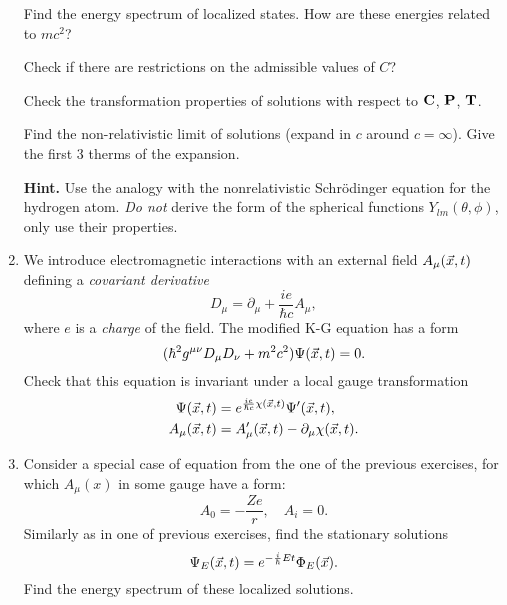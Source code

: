 \documentclass[a4paper,11pt]{article}
\begin{document}
\begin{enumerate}
  Find the energy spectrum of localized states. How are these energies
  related to $m c^{ 2 }$?

  Check if there are restrictions on the admissible values of $C$?

  Check the transformation properties of solutions with respect to
  $\mathbf{C}$, $\mathbf{P}$, $\mathbf{T}$.

  Find the non-relativistic limit of solutions (expand in $c$ around
  $c = \infty$). Give the first 3 therms of the expansion.

  \textbf{Hint.} Use the analogy with the nonrelativistic
  Schr\"{o}dinger equation for the hydrogen atom. \textit{Do not}
  derive the form of the spherical functions
  $Y_{ l m }( \theta, \phi )$, only use their properties.

\item We introduce electromagnetic interactions with an external field
  $A_{ \mu }( \vec{ x }, t )$ defining a \textit{covariant derivative}
  \begin{equation}
    \label{eq:15}
    D_{ \mu } = \partial_{ \mu } + \frac{ i e }{ \hbar c } A_{ \mu },
  \end{equation}
  where $e$ is a \textit{charge} of the field. The modified K-G
  equation has a form
  \begin{equation}
    \label{eq:16}
    ( \hbar^{ 2 } g^{ \mu \nu } D_{ \mu } D_{ \nu } + m^{ 2 } c^{ 2 } ) \Psi( \vec{ x }, t )
    = 0.
  \end{equation}
  Check that this equation is invariant under a local gauge
  transformation
  \begin{align}
    \Psi( \vec{ x }, t )
    &= e^{ \frac{ i e }{ \hbar c } \chi( \vec{ x }, t ) } \Psi'( \vec{ x }, t ), \\
    A_{ \mu }( \vec{ x }, t )
    &= A_{ \mu }'( \vec{ x }, t ) - \partial_{ \mu } \chi( \vec{ x }, t ).
  \end{align}

\item Consider a special case of equation from the one of the previous
  exercises, for which $A_{ \mu }( x )$ in some gauge have a form:
  \begin{equation}
    \label{eq:17}
    A_{ 0 } = -\frac{ Z e }{ r }, \quad
    A_{ i } = 0.
  \end{equation}
  Similarly as in one of previous exercises, find the stationary
  solutions
  \begin{equation}
    \label{eq:18}
    \Psi_{ E }( \vec{ x }, t ) = e^{ -\frac{ i }{ \hbar } E t } \Phi_{ E }( \vec{ x } ).
  \end{equation}
  Find the energy spectrum of these localized solutions.


\end{enumerate}
\end{document}
